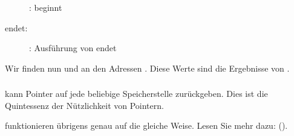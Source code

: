\begin{figure}[H]
\centering
{}
\caption{\olly: \ttfone beginnt}
\label{fig:pointers_olly_stk_2}
\end{figure}

\clearpage
\ttfone endet:

\begin{figure}[H]
\centering
{}
\caption{\olly: Ausführung von \ttfone endet}
\label{fig:pointers_olly_stk_3}
\end{figure}
Wir finden nun  und  an den Adressen \PtrsAddresses.
Diese Werte sind die Ergebnisse von \ttfone.

\subsubsection{\Zusammenfassung{}}
\ttfone kann Pointer auf jede beliebige Speicherstelle zurückgeben.
Dies ist die Quintessenz der Nützlichkeit von Pointern. 
 
\Cpp {} funktionieren übrigens genau auf die gleiche Weise. Lesen Sie mehr dazu: ().